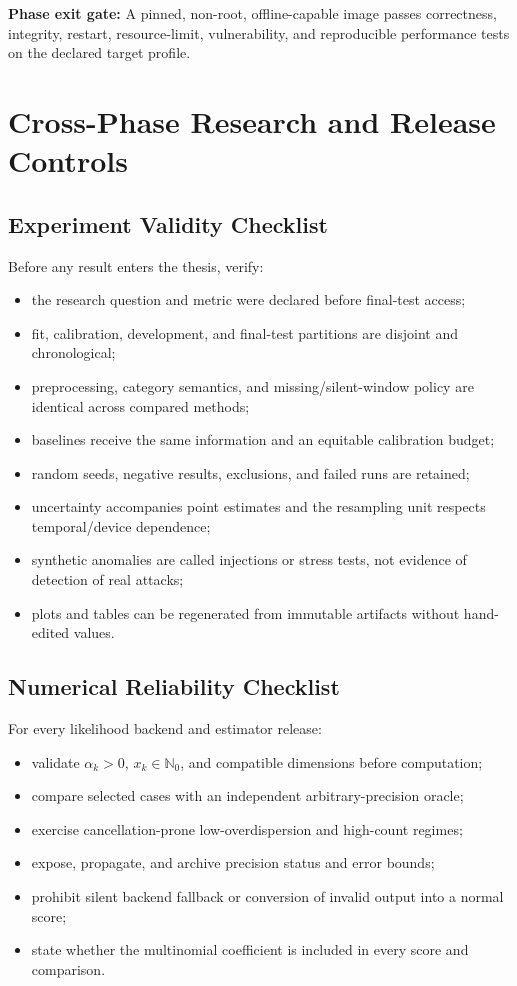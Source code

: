 \documentclass[11pt,a4paper]{article}
\newcommand{\gate}[1]{\textcolor{blue!45!black}{\textbf{Phase exit gate:} #1}}
\begin{document}
\gate{A pinned, non-root, offline-capable image passes correctness, integrity, restart, resource-limit, vulnerability, and reproducible performance tests on the declared target profile.}

\section{Cross-Phase Research and Release Controls}

\subsection{Experiment Validity Checklist}

Before any result enters the thesis, verify:
\begin{itemize}
  \item the research question and metric were declared before final-test access;
  \item fit, calibration, development, and final-test partitions are disjoint and chronological;
  \item preprocessing, category semantics, and missing/silent-window policy are identical across compared methods;
  \item baselines receive the same information and an equitable calibration budget;
  \item random seeds, negative results, exclusions, and failed runs are retained;
  \item uncertainty accompanies point estimates and the resampling unit respects temporal/device dependence;
  \item synthetic anomalies are called injections or stress tests, not evidence of detection of real attacks;
  \item plots and tables can be regenerated from immutable artifacts without hand-edited values.
\end{itemize}

\subsection{Numerical Reliability Checklist}

For every likelihood backend and estimator release:
\begin{itemize}
  \item validate \(\alpha_k>0\), \(x_k\in\mathbb{N}_0\), and compatible dimensions before computation;
  \item compare selected cases with an independent arbitrary-precision oracle;
  \item exercise cancellation-prone low-overdispersion and high-count regimes;
  \item expose, propagate, and archive precision status and error bounds;
  \item prohibit silent backend fallback or conversion of invalid output into a normal score;
  \item state whether the multinomial coefficient is included in every score and comparison.
\end{itemize}
\end{document}
